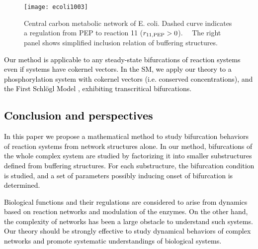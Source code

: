 \documentclass[ amsmath,amssymb,nofootinbib
]{revtex4-1}
\newcommand{\red}[1]{\textcolor{black}{#1}}
\newcommand{\corr}[1]{\textcolor{black}{#1}}
\begin{document}
\begin{figure}[t]
\texttt{[image: ecoli1003]}
\caption{{Central carbon metabolic network of E. coli. Dashed curve indicates a regulation from PEP to reaction 11 ($r_{11,{\rm PEP}}>0$). }　The right panel shows simplified inclusion relation of buffering structures. }
\label{fig:ec}
\end{figure}


\corr{
 Our method is applicable to any steady-state bifurcations of reaction systems even if systems have cokernel vectors. In the SM, we \red{ apply our theory} to a phosphorylation system \cite{CC} with cokernel vectors (i.e. conserved concentrations), and the First Schl\"ogl Model \cite{schlogl}, exhibiting transcritical bifurcations.
}

\corr{
\section{ Conclusion and perspectives}In this paper we propose a mathematical method to study bifurcation behaviors of  reaction systems from network structures alone.
In our method, bifurcations of \red{the} whole complex system are studied by factorizing it  into smaller substructures defined from buffering structures.
For each substructure, the bifurcation condition is studied, and a set of parameters possibly inducing onset of bifurcation is determined.
}

\corr{
Biological functions and their regulations are considered to arise from dynamics based on reaction networks and modulation of the enzymes.
On the other hand, the complexity of networks has been a large obstacle to understand such systems.
Our theory should be strongly effective to study dynamical behaviors of complex networks and promote systematic understandings of biological systems.
}
\end{document}
